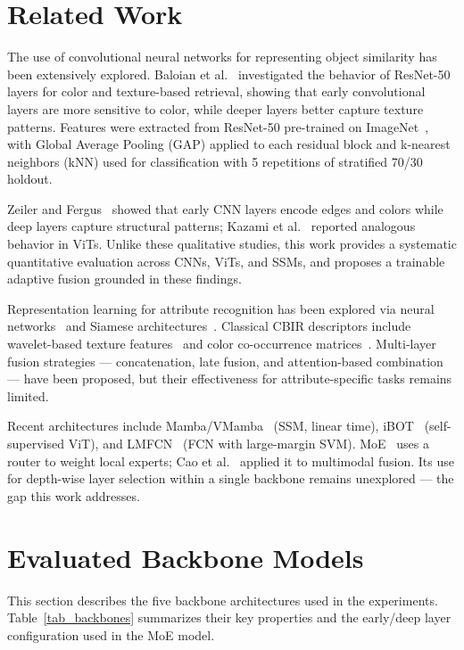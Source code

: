 \documentclass[conference]{IEEEtran}
\begin{document}
\section{Related Work}

The use of convolutional neural networks for representing object similarity
has been extensively explored.
Baloian et al.~\cite{b2} investigated the behavior of ResNet-50 layers for
color and texture-based retrieval, showing that early convolutional layers
are more sensitive to color, while deeper layers better capture texture
patterns.
Features were extracted from ResNet-50 pre-trained on
ImageNet~\cite{b3}, with Global Average Pooling (GAP) applied to each
residual block and k-nearest neighbors (kNN) used for classification with
5 repetitions of stratified 70/30 holdout.

Zeiler and Fergus~\cite{bzeiler} showed that early CNN layers encode
edges and colors while deep layers capture structural patterns; Kazami
et al.~\cite{bkazami} reported analogous behavior in ViTs.
Unlike these qualitative studies, this work provides a systematic
quantitative evaluation across CNNs, ViTs, and SSMs, and proposes a
trainable adaptive fusion grounded in these findings.

Representation learning for attribute recognition has been explored via
neural networks~\cite{b10,b11} and Siamese architectures~\cite{b8}.
Classical CBIR descriptors include wavelet-based texture
features~\cite{b13} and color co-occurrence matrices~\cite{b15}.
Multi-layer fusion strategies — concatenation, late fusion, and
attention-based combination~\cite{b26,b27} — have been proposed, but
their effectiveness for attribute-specific tasks remains limited.

Recent architectures include Mamba/VMamba~\cite{b16} (SSM, linear time),
iBOT~\cite{b17} (self-supervised ViT), and LMFCN~\cite{b28} (FCN with
large-margin SVM).
MoE~\cite{bmoe_orig} uses a router to weight local experts; Cao
et al.~\cite{bmoe_cao} applied it to multimodal fusion.
Its use for depth-wise layer selection within a single backbone remains
unexplored — the gap this work addresses.

\section{Evaluated Backbone Models}

This section describes the five backbone architectures used in the
experiments. Table~\ref{tab_backbones} summarizes their key properties
and the early/deep layer configuration used in the MoE model.
\end{document}
